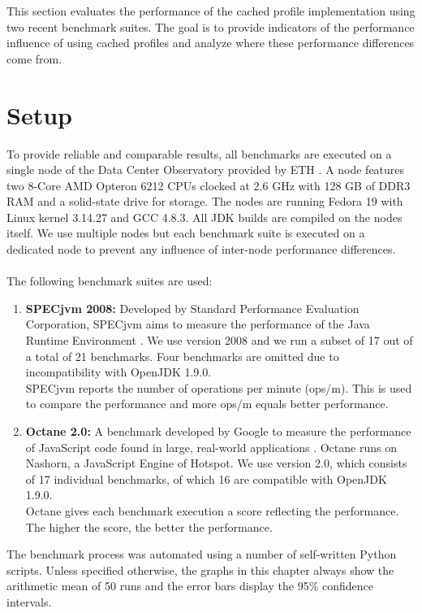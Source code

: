 This section evaluates the performance of the cached profile implementation using two recent benchmark suites. The goal is to provide indicators of the performance influence of using cached profiles and analyze where these performance differences come from.
\section{Setup}
\label{s:perf_setup}
To provide reliable and comparable results, all benchmarks are executed on a single node of the Data Center Observatory provided by ETH \cite{ethdco}.
A node features two 8-Core AMD Opteron 6212 CPUs clocked at 2.6 GHz with 128 GB of DDR3 RAM and a solid-state drive for storage.
The nodes are running Fedora 19 with Linux kernel 3.14.27 and GCC 4.8.3. All JDK builds are compiled on the nodes itself. We use multiple nodes but each benchmark suite is executed on a dedicated node to prevent any influence of inter-node performance differences.
\\\\
The following benchmark suites are used:
\begin{enumerate}
  \item \textbf{SPECjvm 2008:} Developed by Standard Performance Evaluation Corporation, SPECjvm aims to measure the performance of the Java Runtime Environment \cite{specjvm}.  We use version 2008 and we run a subset of 17 out of a total of 21 benchmarks. Four benchmarks are omitted due to incompatibility with OpenJDK 1.9.0.
  \\
  SPECjvm reports the number of operations per minute (ops/m). This is used to compare the performance and more ops/m equals better performance.
  \item \textbf{Octane 2.0:} A benchmark developed by Google to measure the performance of JavaScript code found in large, real-world applications \cite{octane}. Octane runs on Nashorn, a JavaScript Engine of Hotspot. We use version 2.0, which consists of 17 individual benchmarks, of which 16 are compatible with OpenJDK 1.9.0. 
  \\
  Octane gives each benchmark execution a score reflecting the performance. The higher the score, the better the performance.
\end{enumerate}
The benchmark process was automated using a number of self-written Python scripts. Unless specified otherwise, the graphs in this chapter always show the arithmetic mean of 50 runs and the error bars display the 95\% confidence intervals.

